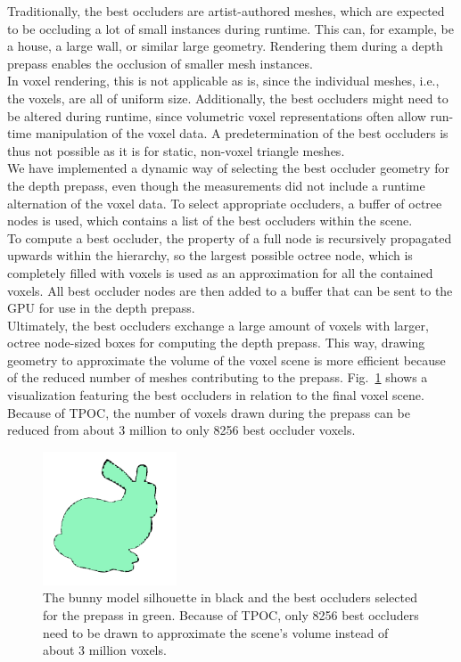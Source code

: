 \documentclass[conference]{IEEEtran}
\begin{document}
\noindent
Traditionally, the best occluders are artist-authored meshes, which are expected to be occluding a lot 
of small instances during runtime. This can, for example, be a house, a large wall, or similar large 
geometry. Rendering them during a depth prepass enables the occlusion of smaller mesh instances. \\

\noindent
In voxel rendering, this is not applicable as is, since the individual meshes, i.e., the voxels, are all 
of uniform size. Additionally, the best occluders might need to be altered during runtime, since 
volumetric voxel representations often allow run-time manipulation of the voxel data. A predetermination 
of the best occluders is thus not possible as it is for static, non-voxel triangle meshes. \\

\noindent   %
We have implemented a dynamic way of selecting the best occluder geometry for the depth prepass, even 
though the measurements did not include a runtime alternation of the voxel data. To select appropriate 
occluders, a buffer of octree nodes is used, which contains a list of the best occluders within the scene. \\

\noindent
To compute a best occluder, the property of a full node is recursively propagated upwards within the hierarchy, 
so the largest possible octree node, which is completely filled with voxels is used as an approximation for 
all the contained voxels. All best occluder nodes are then added to a buffer that can be sent to the \ac{GPU} for 
use in the depth prepass. \\

\noindent
Ultimately, the best occluders exchange a large amount of voxels with larger, octree node-sized boxes for 
computing the depth prepass. This way, drawing geometry to approximate the volume of the voxel scene is 
more efficient because of the reduced number of meshes contributing to the prepass. 
Fig.~\ref{fig:best-occluder-selection} shows a visualization featuring the best occluders in relation 
to the final voxel scene. Because of \ac{TPOC}, the number of voxels drawn during the prepass can be reduced 
from about 3 million to only 8256 best occluder voxels.

\begin{figure}
    \centering
    \includegraphics[width=150px]{images/bunny-best-occluder-outline.png}
    \caption{The bunny model silhouette in black and the best occluders selected for the prepass in green.
    Because of \ac{TPOC}, only 8256 best occluders need to be drawn to approximate the scene's volume instead of about 3 million voxels.}
    \label{fig:best-occluder-selection}
\end{figure}
\end{document}
